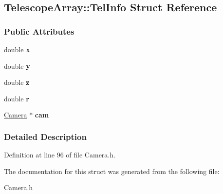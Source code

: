 \hypertarget{structTelescopeArray_1_1TelInfo}{
\subsection{TelescopeArray::TelInfo Struct Reference}
\label{structTelescopeArray_1_1TelInfo}
}
\subsubsection*{Public Attributes}
\begin{DoxyCompactItemize}
\item 
\hypertarget{structTelescopeArray_1_1TelInfo_a1b871ec4117180cd15d34811b019d1c9}{
double {\bfseries x}}
\label{structTelescopeArray_1_1TelInfo_a1b871ec4117180cd15d34811b019d1c9}

\item 
\hypertarget{structTelescopeArray_1_1TelInfo_ac223c97676242b75e51a8792cddd2848}{
double {\bfseries y}}
\label{structTelescopeArray_1_1TelInfo_ac223c97676242b75e51a8792cddd2848}

\item 
\hypertarget{structTelescopeArray_1_1TelInfo_a342df555ce77431ad16a1dcd7319b3da}{
double {\bfseries z}}
\label{structTelescopeArray_1_1TelInfo_a342df555ce77431ad16a1dcd7319b3da}

\item 
\hypertarget{structTelescopeArray_1_1TelInfo_a171393bb0d26b9ab05d7fb19af625d5e}{
double {\bfseries r}}
\label{structTelescopeArray_1_1TelInfo_a171393bb0d26b9ab05d7fb19af625d5e}

\item 
\hypertarget{structTelescopeArray_1_1TelInfo_a1b0d419406746569f08e9076c748597b}{
\hyperlink{classCamera}{Camera} $\ast$ {\bfseries cam}}
\label{structTelescopeArray_1_1TelInfo_a1b0d419406746569f08e9076c748597b}

\end{DoxyCompactItemize}


\subsubsection{Detailed Description}


Definition at line 96 of file Camera.h.



The documentation for this struct was generated from the following file:\begin{DoxyCompactItemize}
\item 
Camera.h\end{DoxyCompactItemize}
